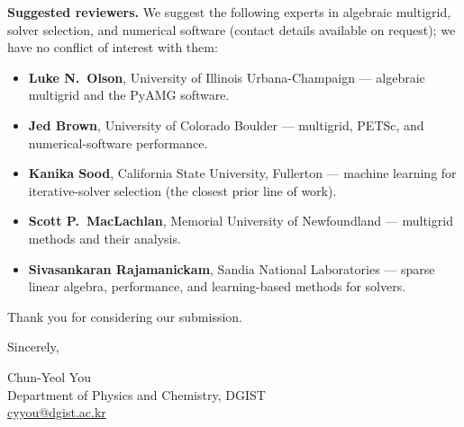 \documentclass[11pt]{article}
\begin{document}
\textbf{Suggested reviewers.} We suggest the following experts in algebraic
multigrid, solver selection, and numerical software (contact details available
on request); we have no conflict of interest with them:

\begin{itemize}
\item \textbf{Luke N.\ Olson}, University of Illinois Urbana-Champaign ---
algebraic multigrid and the PyAMG software.
\item \textbf{Jed Brown}, University of Colorado Boulder --- multigrid, PETSc,
and numerical-software performance.
\item \textbf{Kanika Sood}, California State University, Fullerton --- machine
learning for iterative-solver selection (the closest prior line of work).
\item \textbf{Scott P.\ MacLachlan}, Memorial University of Newfoundland ---
multigrid methods and their analysis.
\item \textbf{Sivasankaran Rajamanickam}, Sandia National Laboratories ---
sparse linear algebra, performance, and learning-based methods for solvers.
\end{itemize}

Thank you for considering our submission.

\vspace{1em}
\noindent Sincerely,

\vspace{1.5em}
\noindent Chun-Yeol You \\
Department of Physics and Chemistry, DGIST \\
\href{mailto:cyyou@dgist.ac.kr}{cyyou@dgist.ac.kr}
\end{document}
